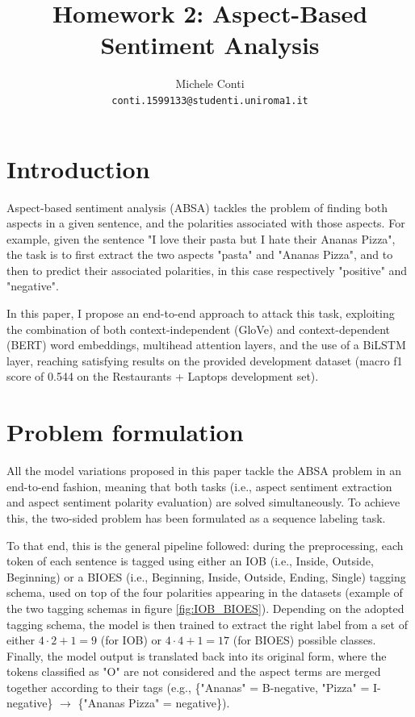 \documentclass[11pt,a4paper]{article}
\title{Homework 2: Aspect-Based Sentiment Analysis}
\author{Michele Conti \\
	\texttt{conti.1599133@studenti.uniroma1.it}\\}
\date{}
\begin{document}
	\maketitle
	\section{Introduction}
	Aspect-based sentiment analysis (ABSA) tackles the problem of finding both
	aspects in a given sentence, and the polarities associated with those aspects.
	For example, given the sentence "I love their pasta but I hate their Ananas
	Pizza", the task is to first extract the two aspects "pasta" and "Ananas Pizza",
	and to then to predict their associated polarities, in this case respectively
	"positive" and "negative".
	
	In this paper, I propose an end-to-end approach to attack this task, exploiting
	the combination of both context-independent (GloVe) and context-dependent (BERT)
	word embeddings, multihead attention layers, and the use of a BiLSTM layer,
	reaching satisfying results on the provided development dataset (macro f1 score
	of 0.544 on the Restaurants + Laptops development set).
	
	\section{Problem formulation}
	All the model variations proposed in this paper tackle the ABSA problem in an
	end-to-end fashion, meaning that both tasks (i.e., aspect sentiment extraction
	and aspect sentiment polarity evaluation) are solved simultaneously. To achieve
	this, the two-sided problem has been formulated as a sequence labeling task. 
	
	To that end, this is the general pipeline followed: during the preprocessing,
	each token of each sentence is tagged using either an IOB (i.e., Inside,
	Outside, Beginning) or a BIOES (i.e., Beginning, Inside, Outside, Ending,
	Single) tagging schema, used on top of the four polarities appearing in the
	datasets (example of the two tagging schemas in figure \ref{fig:IOB_BIOES}).
	Depending on the adopted tagging schema, the model is then trained to extract
	the right label from a set of either  $4 \cdot 2 + 1 = 9$ (for IOB) or $4 \cdot
	4 + 1 = 17$ (for BIOES) possible classes. Finally, the model output is
	translated back into its original form, where the tokens classified as "O" are
	not considered and the aspect terms are merged together according to their tags
	(e.g., \{"Ananas" = B-negative, "Pizza" = I-negative\} $\to$ \{"Ananas Pizza" =
	negative\}).
	
\end{document}
